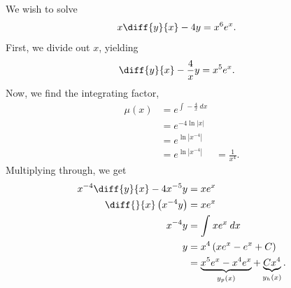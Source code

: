 \documentclass[10pt]{mypackage}
\begin{document}
\begin{example}
  We wish to solve
  \begin{align*}
    x\diff{y}{x} - 4y &= x^{6}e^{x}.
  \end{align*}
  First, we divide out $x$, yielding
  \begin{align*}
    \diff{y}{x} - \frac{4}{x}y &= x^5 e^x.
  \end{align*}
  Now, we find the integrating factor,
  \begin{align*}
    \mu(x) &= e^{\int_{}^{} -\frac{4}{x}\:dx}\\
           &= e^{-4\ln |x|}\\
           &= e^{\ln\left\vert x^{-4}\right\vert}\\
           &= e^{\ln\left\vert x^{-4} \right\vert}
           &= \frac{1}{x^4}.
  \end{align*}
  Multiplying through, we get
  \begin{align*}
    x^{-4}\diff{y}{x} - 4x^{-5}y &= xe^{x}\\
    \diff{}{x}\left(x^{-4} y\right) &= xe^{x}\\
    x^{-4} y &= \int_{}^{} xe^{x}\:dx\\
    y &= x^{4}\left(xe^{x} - e^{x} + C\right)\\
      &= \underbrace{x^{5}e^{x} - x^4e^{x}}_{y_p(x)} + \underbrace{Cx^{4}}_{y_h(x)}.
  \end{align*}
\end{example}
\end{document}
